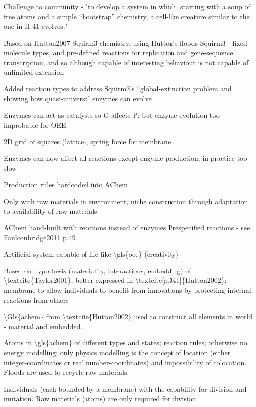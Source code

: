 \autocite{Lucht2012}

Challenge to community - "to develop a system in which, starting with a soup of free atoms and a simple ``bootstrap'' chemistry, a cell-like creature similar to the one in H-41 evolves."

Based on Hutton2007 Squirm3 chemistry, using Hutton's floods 
Squirm3 - fixed molecule types, and pre-defined reactions for replication and gene-sequence transcription, and so although capable of interesting behaviour is not capable of unlimited extension

Added reaction types to address Squirm3's ``global-extinction problem and showing how quasi-universal enzymes can evolve

\autocite{Hutton2007}

Enzymes can act as catalysts so G affects P; but enzyme evolution too improbable for OEE

2D grid of squares (lattice), spring force for membrane

Enzymes can now affect all reactions except enzyme production; in practice too slow

Production rules hardcoded into AChem

Only with raw materials in environment, niche construction through adaptation to availability of raw materials

AChem hand-built with reactions instead of enzymes
Prespecified reactions - see Faulconbridge2011 p.49

Artificial system capable of life-like \textbackslash{}gls\{oee\} (creativity)

Based on hypothesis (materiality, interactions, embedding) of \textbackslash{}textcite\{Taylor2001\}, better expressed in \textbackslash{}textcite{[}p.341{]}\{Hutton2002\}; membrane to allow
individuals to benefit from innovations by protecting internal reactions from others

\textbackslash{}Gls\{achem\} from \textbackslash{}textcite\{Hutton2002\} used to construct all elements in world - material and embedded.

Atoms in \textbackslash{}gls\{achem\} of different types and states; reaction rules; otherwise no energy modelling; only physics modelling is the concept of location (either integer-coordinates or real number-coordinates) and impossibility of colocation. Floods are used to recycle raw materials.

Individuals (each bounded by a membrane) with the capability for division and mutation. Raw materials (atoms) are only required for division

